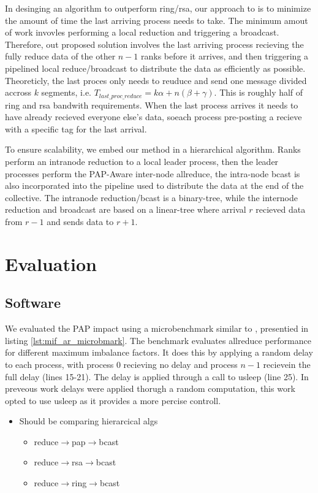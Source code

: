 In desinging an algorithm to outperform ring/rsa, our approach to is to minimize the amount of time the last arriving process needs to take.
The minimum amout of work invovles performing a local reduction and triggering a broadcast.
Therefore, out proposed solution involves the last arriving process recieving the fully reduce data of the other $n-1$ ranks before it arrives, and then triggering a pipelined local reduce/broadcast to distribute the data as efficiently as possible. 
Theoreticly, the last proces only needs to reuduce and send one message divided accross $k$ segments, i.e. $T_{last\_proc\_reduce}=k\alpha+n(\beta+\gamma)$.
This is roughly half of ring and rsa bandwith requirements.
When the last process arrives it needs to have already recieved everyone else's data, soeach process pre-posting a recieve with a specific tag for the last arrival.

To ensure scalability, we embed our method in a hierarchical algorithm. 
Ranks perform an intranode reduction to a local leader process, then the leader processes perform the PAP-Aware inter-node allreduce, the intra-node bcast is also incorporated into the pipeline used to distribute the data at the end of the collective. 
The intranode reduction/bcast is a binary-tree, while the internode reduction and broadcast are based on a linear-tree where arrival $r$ recieved data from $r-1$ and sends data to $r+1$.


\section{Evaluation}

\subsection{Software}
We evaluated the PAP impact using a microbenchmark similar to \cite{Faraj2008StudyProcArrivalMPIColl}, presentied in listing \ref{lst:mif_ar_microbmark}.
The benchmark evaluates allreduce performance for different maximum imbalance factors. 
It does this by applying a random delay to each process, with process 0 recieving no delay and process $n-1$ recievein the full delay (lines 15-21).
The delay is applied through a call to usleep (line 25).
In preveous work \cite{Faraj2008StudyProcArrivalMPIColl, Alizadeh2022PAPCollDL} delays were applied thorugh a random computation, this work opted to use usleep as it provides a more percise controll.


\begin{itemize}
    \item Should be comparing hierarcical algs
    \begin{itemize}
        \item reduce$\rightarrow$pap$\rightarrow$bcast
        \item reduce$\rightarrow$rsa$\rightarrow$bcast
        \item reduce$\rightarrow$ring$\rightarrow$bcast
    \end{itemize}
\end{itemize}

